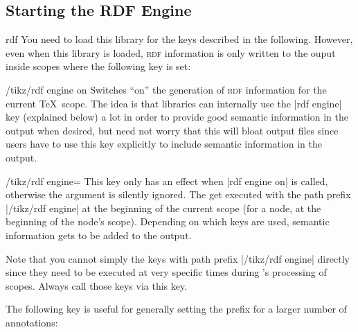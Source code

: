 \subsection{Starting the RDF Engine}

\begin{tikzlibrary}{rdf}
  You need to load this library for the keys described in the
  following. However, even when this library is loaded, 
  \textsc{rdf} information is only written to the ouput inside scopes
  where the following key is set:
  \begin{key}{/tikz/rdf engine on}
    Switches ``on'' the generation of \textsc{rdf} information for the
    current \TeX\ scope. The
    idea is that libraries can internally use the |rdf engine| key
    (explained below) a lot in order to provide good semantic
    information in the output when desired, but need not worry that
    this will bloat output files since users have to use this key
    explicitly to include semantic information in the output.
  \end{key}
\end{tikzlibrary}


\begin{key}{/tikz/rdf engine=}
  This key only has an effect when |rdf engine on| is called,
  otherwise the argument is silently ignored. The  get
  executed with the path prefix |/tikz/rdf engine| at the beginning of
  the current scope (for a node, at the beginning of the node's
  scope). Depending on which keys are used, semantic information gets
  to be added to the output.

  Note that you cannot simply the keys with path prefix
  |/tikz/rdf engine| directly since they need to be executed at very
  specific times during \tikzname's processing of scopes. Always call
  those keys via this key.
\end{key}


The following key is useful for generally setting the prefix for a
larger number of annotations:

